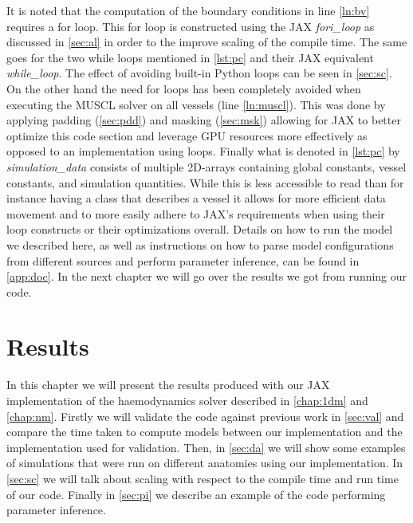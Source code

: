 \documentclass[a4paper, oneside]{discothesis}
\begin{document}
						It is noted that the computation of the boundary conditions in line \ref{ln:bv} requires a for loop.
						This for loop is constructed using the JAX \emph{fori\_loop} as discussed in \autoref{sec:al} in order to the improve scaling of the compile time.
						The same goes for the two while loops mentioned in \autoref{lst:pc} and their JAX equivalent \emph{while\_loop}.
						The effect of avoiding built-in Python loops can be seen in \autoref{sec:sc}.
						On the other hand the need for loops has been completely avoided when executing the MUSCL solver on all vessels (line \ref{ln:muscl}).
						This was done by applying padding (\autoref{sec:pdd}) and masking (\autoref{sec:msk}) allowing for JAX to better optimize this code section and leverage GPU resources more effectively as opposed to an implementation using loops.
						Finally what is denoted in \autoref{lst:pc} by \emph{simulation\_data} consists of multiple 2D-arrays containing global constants, vessel constants, and simulation quantities.
						While this is less accessible to read than for instance having a class that describes a vessel it allows for more efficient data movement and to more easily adhere to JAX's requirements when using their loop constructs or their optimizations overall.
						Details on how to run the model we described here, as well as instructions on how to parse model configurations from different sources and perform parameter inference, can be found in \autoref{app:doc}. 
						In the next chapter we will go over the results we got from running our code.



						\chapter{Results} \label{chap:resl}
						In this chapter we will present the results produced with our JAX implementation of the haemodynamics solver described in \autoref{chap:1dm} and \autoref{chap:nm}. 
						Firstly we will validate the code against previous work in \autoref{sec:val} and compare the time taken to compute models between our implementation and the implementation used for validation.
						Then, in \autoref{sec:da} we will show some examples of simulations that were run on different anatomies using our implementation.
						In \autoref{sec:sc} we will talk about scaling with respect to the compile time and run time of our code.
						Finally in \autoref{sec:pi} we describe an example of the code performing parameter inference. 
\end{document}
